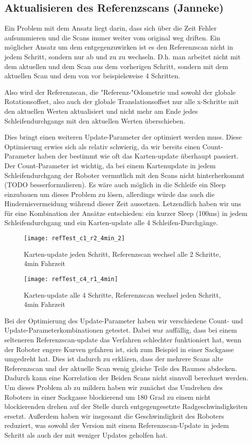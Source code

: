 \subsection{Aktualisieren des Referenzscans (Janneke)}

Ein Problem mit dem Ansatz liegt darin, dass sich über die Zeit Fehler aufsummieren und die Scans immer weiter vom original weg driften. Ein möglicher Ansatz um dem entgegenzuwirken ist es den Referenzscan nicht in jedem Schritt, sondern nur ab und zu zu wechseln. D.h. man arbeitet nicht mit dem aktuellen und dem Scan aus dem vorherigen Schritt, sondern mit dem aktuellen Scan und dem von vor beispielsweise 4 Schritten.

Also wird der Referenzscan, die "Referenz-"Odometrie und sowohl der globale Rotationsoffset, also auch der globale Translationsoffset nur alle x-Schritte mit den aktuellen Werten aktualisiert und nicht mehr am Ende jedes Schleifendurchgangs mit den aktuellen Werten überschieben. 

Dies bringt einen weiteren Update-Parameter der optimiert werden muss. Diese Optimierung erwies sich als relativ schwierig, da wir bereits einen Count-Parameter haben der bestimmt wie oft das Karten-update überhaupt passiert. Der Count-Parameter ist wichtig, da bei einem Kartenupdate in jedem Schleifendurchgang der Roboter vermutlich mit den Scans nicht hinterherkommt (TODO besserformulieren). Es wäre auch möglich in die Schleife ein Sleep einzubauen um dieses Problem zu lösen, allerdings würde das auch die Hindernisvermeidung während dieser Zeit aussetzen. Letzendlich haben wir uns für eine Kombination der Ansätze entschieden: ein kurzer Sleep (100ms) in jedem Schleifendurchgang und ein Karten-update alle 4 Schleifen-Durchgänge.

\begin{figure}
	\centering
	\texttt{[image: refTest\_c1\_r2\_4min\_2]}
	\caption{Karten-update jeden Schritt, Referenzscan wechsel alle 2 Schritte, 4min Fahrzeit\newline}
	\label{fig:count1_r2_4min}
	\texttt{[image: refTest\_c4\_r1\_4min]}
	\caption{Karten-update alle 4 Schritte, Referenzscan wechsel jeden Schritt, 4min Fahrzeit}
	\label{fig:count4_r1_4min}
\end{figure}

Bei der Optimierung des Update-Parameter haben wir verschiedene Count- und Update-Parameterkombinationen getestet. Dabei war auffällig, dass bei einem selteneren Referenzscan-update das Verfahren schlechter funktioniert hat, wenn der Roboter engere Kurven gefahren ist, sich zum Beispiel in einer Sackgasse umgedreht hat. Dies ist dadurch zu erklären, dass der mehrere Scans alte Referenzscan und der aktuelle Scan wenig gleiche Teile des Raumes abdecken. Dadurch kann eine Korrelation der Beiden Scans nicht sinnvoll berechnet werden. Um dieses Problem ab zu mildern haben wir zunächst das Umdrehen des Roboters in einer Sackgasse blockierend um 180 Grad zu einem nicht blockierenden drehen auf der Stelle durch entgegengesetzte Radgeschwindigkeiten ersetzt. Außerdem haben wir insgesamt die Geschwindigkeit des Roboters reduziert, was sowohl der Version mit einem Referenzscan-Update in jedem Schritt als auch der mit weniger Updates geholfen hat.

